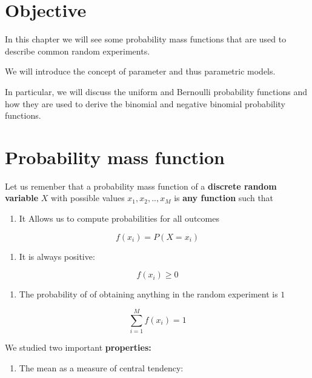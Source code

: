 \documentclass[
]{book}
\providecommand{\tightlist}{%
  \setlength{\itemsep}{0pt}\setlength{\parskip}{0pt}}
\begin{document}
\hypertarget{objective-3}{%
\section{Objective}\label{objective-3}}

In this chapter we will see some probability mass functions that are used to describe common random experiments.

We will introduce the concept of parameter and thus parametric models.

In particular, we will discuss the uniform and Bernoulli probability functions and how they are used to derive the binomial and negative binomial probability functions.

\hypertarget{probability-mass-function}{%
\section{Probability mass function}\label{probability-mass-function}}

Let us remenber that a probability mass function of a \textbf{discrete random variable} \(X\) with possible values \(x_1 , x_2 , .. , x_M\) is \textbf{any function} such that

\begin{enumerate}
\def\labelenumi{\arabic{enumi})}
\tightlist
\item
  It Allows us to compute probabilities for all outcomes
\end{enumerate}

\[f(x_i)=P(X=x_i)\]

\begin{enumerate}
\def\labelenumi{\arabic{enumi})}
\setcounter{enumi}{1}
\tightlist
\item
  It is always positive:
\end{enumerate}

\[f(x_i)\geq 0\]

\begin{enumerate}
\def\labelenumi{\arabic{enumi})}
\setcounter{enumi}{2}
\tightlist
\item
  The probability of of obtaining anything in the random experiment is \(1\)
\end{enumerate}

\[\sum_{i=1}^M f(x_i)=1\]

We studied two important \textbf{properties:}

\begin{enumerate}
\def\labelenumi{\arabic{enumi})}
\tightlist
\item
  The mean as a measure of central tendency:
\end{enumerate}
\end{document}

